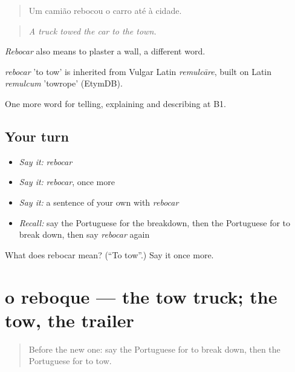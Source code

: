 \begin{quote}
Um camião rebocou o carro até à cidade.
\end{quote}

\begin{quote}
\emph{A truck towed the car to the town.}
\end{quote}

\emph{Rebocar} also means to plaster a wall, a different word.

\begin{cousinweb}
\emph{rebocar} 'to tow' is inherited from Vulgar Latin \emph{remulcāre}, built on Latin \emph{remulcum} 'towrope' (EtymDB).
\end{cousinweb}

\begin{grammarlens}[title={What you've built}]
One more word for telling, explaining and describing at B1.
\end{grammarlens}

\subsection*{Your turn}
\begin{itemize}
\raggedright
  \item \emph{Say it:} \emph{rebocar}
  \item \emph{Say it:} \emph{rebocar}, once more
  \item \emph{Say it:} a sentence of your own with \emph{rebocar}
  \item \emph{Recall:} say the Portuguese for the breakdown, then the Portuguese for to break down, then say \emph{rebocar} again
\end{itemize}

\begin{tcolorbox}[breakable,colback=teal!4,colframe=teal!35!black,title={Before you move on}]
What does rebocar mean? (\textquotedblleft{}To tow\textquotedblright{}.) Say it once more.
\end{tcolorbox}
\section[o reboque]{o reboque — the tow truck; the tow, the trailer}

\label{lesson:PT-C406-reboque}



\begin{quote}
Before the new one: say the Portuguese for to break down, then the Portuguese for to tow.
\end{quote}

